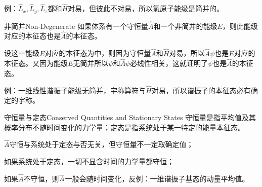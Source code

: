 例：$\hat L_x,\hat L_y,\hat L_z$都和$\hat H$对易，但彼此不对易，所以氢原子能级是简并的。
\begin{theorem}{非简并}{Non-Degenerate}
	如果体系有一个守恒量$\hat A$和一个非简并的能级$E$，则此能级对应的本征态也是$\hat A$的本征态。
\end{theorem}
\prf 设这一能级$E$对应的本征态为中，则因为守恒量$\hat A$和$\hat H$对易，所以$\hat A\psi$也是$E$对应的本征态。又因为能级$E$无简并所以$\psi$和$\hat A\psi$必线性相关，这就证明了$\psi$也是$\hat A$的本征态。

例：一维线性谐振子能级无简并，宇称算符与$\hat H$对易，所以谐振子的本征态必有确定的宇称。
\begin{theorem}{守恒量与定态}{Conserved Quantities and Stationary States}
	守恒量是指平均值及其概率分布不随时间变化的力学量；定态是指系统处于某一特定的能量本征态。
	\begin{compactenum}
		\item $\hat A$守恒与系统处于定态与否无关，但守恒量不一定取确定值；
		\item 如果系统处于定态，一切不显含时间的力学量都守恒；
		\item 如果$\hat A$不守恒，则$\overline A$一般会随时间变化，反例：一维谐振子基态的动量平均值。
	\end{compactenum}
\end{theorem}
